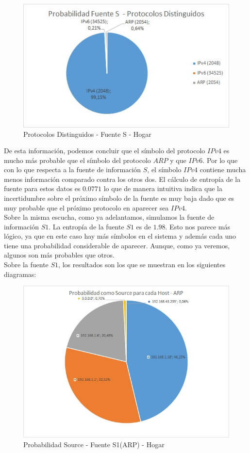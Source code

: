 \begin{figure}[h!]
\centering
\includegraphics[scale=0.9]{./img/probaS_casa.jpg}
\caption{Protocolos Distinguidos - Fuente S - Hogar}
\end{figure}

De esta información, podemos concluir que el símbolo del protocolo $IPv4$ es mucho más probable que el símbolo del protocolo $ARP$ y que $IPv6$. 
Por lo que con lo que respecta a la fuente de información $S$, el símbolo $IPv4$ contiene mucha menos información comparado contra los otros dos. 
El cálculo de entropía de la fuente para estos datos es $0.0771$ lo que de manera intuitiva indica que la incertidumbre sobre el próximo símbolo 
de la fuente es muy baja dado que es muy probable que el próximo protocolo en aparecer sea $IPv4$.\\

Sobre la misma escucha, como ya adelantamos, simulamos la fuente de información $S1$. 
La entropía de la fuente $S1$ es de $1.98$. Esto nos parece más lógico, ya que en este caso hay más símbolos en el sistema y 
además cada uno tiene una probabilidad considerable de aparecer. Aunque, como ya veremos, algunos son más probables que otros.\\

Sobre la fuente $S1$, los resultados son los que se muestran en los siguientes diagramas:

\begin{figure}[h!]
\centering
\includegraphics[scale=0.7]{./img/proba_src_casa.jpg}
\caption{Probabilidad Source - Fuente S1(ARP) - Hogar}
\end{figure}

